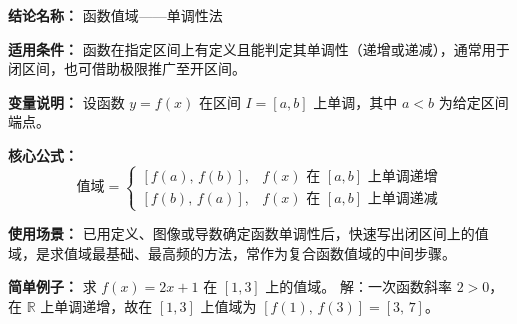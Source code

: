 \textbf{结论名称：} 函数值域——单调性法

\textbf{适用条件：} 函数在指定区间上有定义且能判定其单调性（递增或递减），通常用于闭区间，也可借助极限推广至开区间。

\textbf{变量说明：} 设函数 \(y=f(x)\) 在区间 \(I=[a,b]\) 上单调，其中 \(a<b\) 为给定区间端点。

\textbf{核心公式：}
\[
\boxed{\text{值域}=
\begin{cases}
[f(a),\,f(b)], & f(x)\text{ 在 }[a,b]\text{ 上单调递增}\\[4pt]
[f(b),\,f(a)], & f(x)\text{ 在 }[a,b]\text{ 上单调递减}
\end{cases}}
\]

\textbf{使用场景：} 已用定义、图像或导数确定函数单调性后，快速写出闭区间上的值域，是求值域最基础、最高频的方法，常作为复合函数值域的中间步骤。

\textbf{简单例子：} 
求 \(f(x)=2x+1\) 在 \([1,3]\) 上的值域。
解：一次函数斜率 \(2>0\)，在 \(\mathbb{R}\) 上单调递增，故在 \([1,3]\) 上值域为 \([f(1),\,f(3)]=[3,\,7]\)。